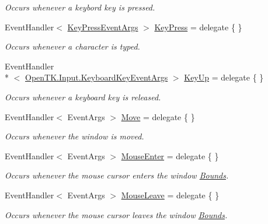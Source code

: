 \begin{DoxyCompactItemize}
\begin{DoxyCompactList}\small\item\em Occurs whenever a keybord key is pressed. \end{DoxyCompactList}\item 
Event\-Handler$<$ \hyperlink{class_open_t_k_1_1_key_press_event_args}{Key\-Press\-Event\-Args} $>$ \hyperlink{class_open_t_k_1_1_native_window_a77b59f8d65f596bdabc4f199dfa1dc0e}{Key\-Press} = delegate \{ \}
\begin{DoxyCompactList}\small\item\em Occurs whenever a character is typed. \end{DoxyCompactList}\item 
Event\-Handler\\*
$<$ \hyperlink{class_open_t_k_1_1_input_1_1_keyboard_key_event_args}{Open\-T\-K.\-Input.\-Keyboard\-Key\-Event\-Args} $>$ \hyperlink{class_open_t_k_1_1_native_window_ab124b92a7dc7bec0d6a752b15103e36d}{Key\-Up} = delegate \{ \}
\begin{DoxyCompactList}\small\item\em Occurs whenever a keyboard key is released. \end{DoxyCompactList}\item 
Event\-Handler$<$ Event\-Args $>$ \hyperlink{class_open_t_k_1_1_native_window_aab24c27eb84152880e401b0c74718ce8}{Move} = delegate \{ \}
\begin{DoxyCompactList}\small\item\em Occurs whenever the window is moved. \end{DoxyCompactList}\item 
Event\-Handler$<$ Event\-Args $>$ \hyperlink{class_open_t_k_1_1_native_window_a04e101987663c30051ae857f7b440f52}{Mouse\-Enter} = delegate \{ \}
\begin{DoxyCompactList}\small\item\em Occurs whenever the mouse cursor enters the window \hyperlink{class_open_t_k_1_1_native_window_ac0325973134062eba62484df45236464}{Bounds}. \end{DoxyCompactList}\item 
Event\-Handler$<$ Event\-Args $>$ \hyperlink{class_open_t_k_1_1_native_window_aa1f74c551b636689078e31d72627e856}{Mouse\-Leave} = delegate \{ \}
\begin{DoxyCompactList}\small\item\em Occurs whenever the mouse cursor leaves the window \hyperlink{class_open_t_k_1_1_native_window_ac0325973134062eba62484df45236464}{Bounds}. \end{DoxyCompactList}\item 

\end{DoxyCompactItemize}
